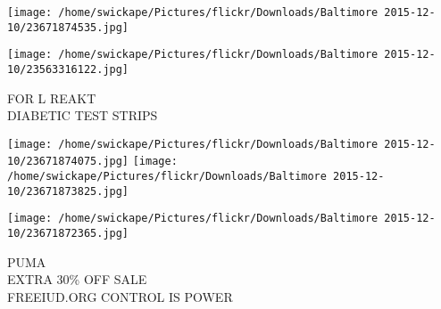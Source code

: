 \documentclass[10pt,letterpaper]{article}
\begin{document}
\texttt{[image: /home/swickape/Pictures/flickr/Downloads/Baltimore 2015-12-10/23671874535.jpg]}

\vspace{0.25in}
\texttt{[image: /home/swickape/Pictures/flickr/Downloads/Baltimore 2015-12-10/23563316122.jpg]}

FOR L REAKT\\
DIABETIC TEST STRIPS
\pagebreak

\texttt{[image: /home/swickape/Pictures/flickr/Downloads/Baltimore 2015-12-10/23671874075.jpg]}
\texttt{[image: /home/swickape/Pictures/flickr/Downloads/Baltimore 2015-12-10/23671873825.jpg]}

\texttt{[image: /home/swickape/Pictures/flickr/Downloads/Baltimore 2015-12-10/23671872365.jpg]}

PUMA\\
EXTRA 30\% OFF SALE\\
FREEIUD.ORG CONTROL IS POWER
\pagebreak
\end{document}
